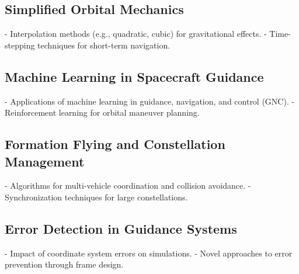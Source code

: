 \subsection{Simplified Orbital Mechanics}
- Interpolation methods (e.g., quadratic, cubic) for gravitational effects.
- Time-stepping techniques for short-term navigation.

\subsection{Machine Learning in Spacecraft Guidance}
- Applications of machine learning in guidance, navigation, and control (GNC).
- Reinforcement learning for orbital maneuver planning.

\subsection{Formation Flying and Constellation Management}
- Algorithms for multi-vehicle coordination and collision avoidance.
- Synchronization techniques for large constellations.

\subsection{Error Detection in Guidance Systems}
- Impact of coordinate system errors on simulations.
- Novel approaches to error prevention through frame design.


\endinput  %
